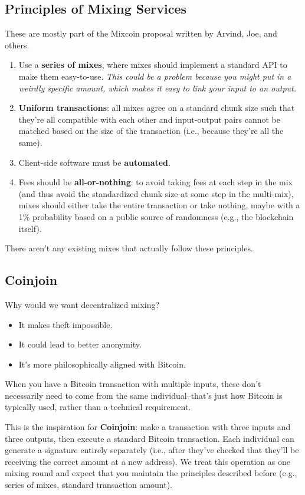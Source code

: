 \documentclass[12pt]{article}
\begin{document}
\subsection*{Principles of Mixing Services}

These are mostly part of the Mixcoin proposal written by Arvind, Joe, and others.

\begin{enumerate}
\item Use a \textbf{series of mixes}, where mixes should implement a standard API to make them easy-to-use. \textit{This could be a problem because you might put in a weirdly specific amount, which makes it easy to link your input to an output.}
\item \textbf{Uniform transactions}: all mixes agree on a standard chunk size such that they're all compatible with each other and input-output pairs cannot be matched based on the size of the transaction (i.e., because they're all the same).
\item Client-side software must be \textbf{automated}.
\item Fees should be \textbf{all-or-nothing}: to avoid taking fees at each step in the mix (and thus avoid the standardized chunk size at some step in the multi-mix), mixes should either take the entire transaction or take nothing, maybe with a 1\% probability based on a public source of randomness (e.g., the blockchain itself).
\end{enumerate}

There aren't any existing mixes that actually follow these principles.

\subsection*{Coinjoin}

Why would we want decentralized mixing?
\begin{itemize}
\item It makes theft impossible.
\item It could lead to better anonymity.
\item It's more philosophically aligned with Bitcoin.
\end{itemize}

When you have a Bitcoin transaction with multiple inputs, these don't necessarily need to come from the same individual--that's just how Bitcoin is typically used, rather than a technical requirement.

This is the inspiration for \textbf{Coinjoin}: make a transaction with three inputs and three outputs, then execute a standard Bitcoin transaction. Each individual can generate a signature entirely separately (i.e., after they've checked that they'll be receiving the correct amount at a new address). We treat this operation as one mixing round and expect that you maintain the principles described before (e.g., series of mixes, standard transaction amount).
\end{document}
